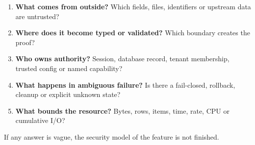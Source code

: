\begin{enumerate}
  \item \textbf{What comes from outside?} Which fields, files, identifiers or upstream data are untrusted?
  \item \textbf{Where does it become typed or validated?} Which boundary creates the proof?
  \item \textbf{Who owns authority?} Session, database record, tenant membership, trusted config or named capability?
  \item \textbf{What happens in ambiguous failure?} Is there a fail-closed, rollback, cleanup or explicit unknown state?
  \item \textbf{What bounds the resource?} Bytes, rows, items, time, rate, CPU or cumulative I/O?
\end{enumerate}

If any answer is vague, the security model of the feature is not finished.
